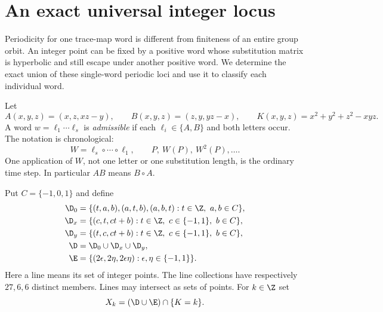 \section{An exact universal integer locus}\label{sec:intro}

Periodicity for one trace-map word is different from finiteness of
an entire group orbit. An integer point can be fixed by a positive
word whose substitution matrix is hyperbolic and still escape under
another positive word. We determine the exact union of these
single-word periodic loci and use it to classify each individual word.

Let
\begin{equation}\label{eq:maps}
 A(x,y,z)=(x,z,xz-y),\qquad B(x,y,z)=(z,y,yz-x),
 \qquad K(x,y,z)=x^2+y^2+z^2-xyz.
\end{equation}
A word $w=\ell_1\cdots\ell_s$ is \emph{admissible} if each
$\ell_i\in\{A,B\}$ and both letters occur. The notation is
chronological:
\begin{equation}\label{eq:clock}
 W=\ell_s\circ\cdots\circ\ell_1,\qquad
 P,\ W(P),\ W^2(P),\ldots .
\end{equation}
One application of $W$, not one letter or one substitution length,
is the ordinary time step. In particular $AB$ means $B\circ A$.

Put $C=\{-1,0,1\}$ and define
\begin{equation}\label{eq:locus}
 \begin{aligned}
 \D_0&=\{(t,a,b),(a,t,b),(a,b,t):t\in\Z,\ a,b\in C\},\\
 \D_x&=\{(c,t,ct+b):t\in\Z,\ c\in\{-1,1\},\ b\in C\},\\
 \D_y&=\{(t,c,ct+b):t\in\Z,\ c\in\{-1,1\},\ b\in C\},\\
 \D&=\D_0\cup\D_x\cup\D_y,\\
 \E&=\{(2\epsilon,2\eta,2\epsilon\eta):
                  \epsilon,\eta\in\{-1,1\}\}.
 \end{aligned}
\end{equation}
Here a line means its set of integer points. The line collections
have respectively $27,6,6$ distinct members. Lines may intersect
as sets of points. For $k\in\Z$ set
\begin{equation}\label{eq:Xk}
 X_k=(\D\cup\E)\cap\{K=k\}.
\end{equation}

